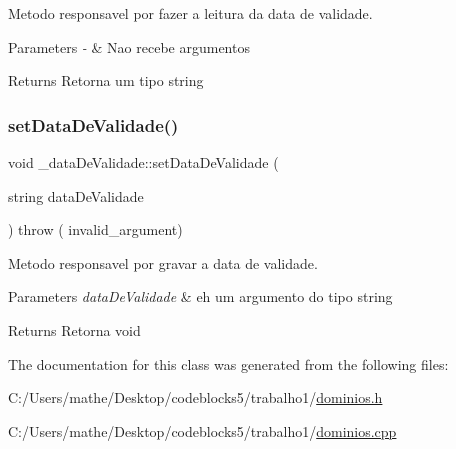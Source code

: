 Metodo responsavel por fazer a leitura da data de validade. 


\begin{DoxyParams}{Parameters}
{\em -\/} & Nao recebe argumentos \\
\hline
\end{DoxyParams}
\begin{DoxyReturn}{Returns}
Retorna um tipo string 
\end{DoxyReturn}
\mbox{\label{class__data_de_validade_aff3df56774e75db38d1706e2d7af6b19}} 
\subsubsection{\texorpdfstring{setDataDeValidade()}{setDataDeValidade()}}
{\footnotesize\ttfamily void \+\_\+data\+De\+Validade\+::set\+Data\+De\+Validade (\begin{DoxyParamCaption}\item[{string}]{data\+De\+Validade }\end{DoxyParamCaption}) throw ( invalid\+\_\+argument) }



Metodo responsavel por gravar a data de validade. 


\begin{DoxyParams}{Parameters}
{\em data\+De\+Validade} & eh um argumento do tipo string \\
\hline
\end{DoxyParams}
\begin{DoxyReturn}{Returns}
Retorna void 
\end{DoxyReturn}


The documentation for this class was generated from the following files\+:\begin{DoxyCompactItemize}
\item 
C\+:/\+Users/mathe/\+Desktop/codeblocks5/trabalho1/\mbox{\hyperlink{dominios_8h}{dominios.\+h}}\item 
C\+:/\+Users/mathe/\+Desktop/codeblocks5/trabalho1/\mbox{\hyperlink{dominios_8cpp}{dominios.\+cpp}}\end{DoxyCompactItemize}
